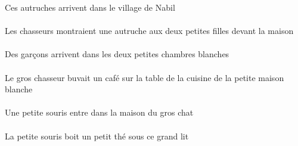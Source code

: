 \begin{exe}
Ces autruches arrivent dans le village de Nabil
\ex\gll
\DEFSgObl{}   \maisonDSgObl{}   \DEVANT{}   \DEFPlErg{}   \chasseurCPlErg{}    \DEFDuDat{}   \petitCDu{}   \filleCDuDat{}   \INDSgAbs{}   \autrucheBSgAbs{}  \montrerVdPstBSg{}\\
\DEFSgOblP{}   \maisonDSgOblP{}   \DEVANTP{}   \DEFPlErgP{}   \chasseurCPlErgP{}    \DEFDuDatP{}   \petitCDuP{}   \filleCDuDatP{}   \INDSgAbsP{}   \autrucheBSgAbsP{}  \montrerVdPstBSgP{}\\
Les chasseurs montraient une autruche aux deux petites filles devant la maison
\ex\gll
\INDPlAbs{}   \garconDPlAbs{}    \DEFDuObl{}   \petitBDu{}   \blancBDu{}   \chambreBDuObl{}   \DANS{}  \arriverViPrsDPl{}\\
\INDPlAbsP{}   \garconDPlAbsP{}    \DEFDuOblP{}   \petitBDuP{}   \blancBDuP{}   \chambreBDuOblP{}   \DANSP{}  \arriverViPrsDPlP{}\\
Des garçons arrivent dans les deux petites chambres blanches
\ex\gll
\DEFSgObl{}    \DEFSgObl{}    \DEFSgObl{}   \petitDSg{}   \blancDSg{}   \maisonDSgObl{}   \DE{}   \cuisineDSgObl{}   \DE{}   \tableDSgObl{}   \SUR{}   \DEFSgErg{}   \grosCSg{}   \chasseurCSgErg{}   \INDSgAbs{}   \cafeCSgAbs{}  \boireVtPstCSg{}\\
\DEFSgOblP{}    \DEFSgOblP{}    \DEFSgOblP{}   \petitDSgP{}   \blancDSgP{}   \maisonDSgOblP{}   \DEP{}   \cuisineDSgOblP{}   \DEP{}   \tableDSgOblP{}   \SURP{}   \DEFSgErgP{}   \grosCSgP{}   \chasseurCSgErgP{}   \INDSgAbsP{}   \cafeCSgAbsP{}  \boireVtPstCSgP{}\\
Le gros chasseur buvait un café sur la table de la cuisine de la petite maison blanche
\ex\gll
\INDSgAbs{}   \petitBSg{}   \sourisBSgAbs{}    \DEFSgObl{}    \DEFSgObl{}   \grosDSg{}   \chatDSgObl{}   \DE{}   \maisonDSgObl{}   \DANS{}  \entrerViPrsBSg{}\\
\INDSgAbsP{}   \petitBSgP{}   \sourisBSgAbsP{}    \DEFSgOblP{}    \DEFSgOblP{}   \grosDSgP{}   \chatDSgOblP{}   \DEP{}   \maisonDSgOblP{}   \DANSP{}  \entrerViPrsBSgP{}\\
Une petite souris entre dans la maison du gros chat
\ex\gll
\DEMSgObl{}   \grandDSg{}   \litDSgObl{}   \SOUS{}   \DEFSgErg{}   \petitBSg{}   \sourisBSgErg{}   \INDSgAbs{}   \petitBSg{}   \theBSgAbs{}  \boireVtPrsBSg{}\\
\DEMSgOblP{}   \grandDSgP{}   \litDSgOblP{}   \SOUSP{}   \DEFSgErgP{}   \petitBSgP{}   \sourisBSgErgP{}   \INDSgAbsP{}   \petitBSgP{}   \theBSgAbsP{}  \boireVtPrsBSgP{}\\
La petite souris boit un petit thé sous ce grand lit

\end{exe}
